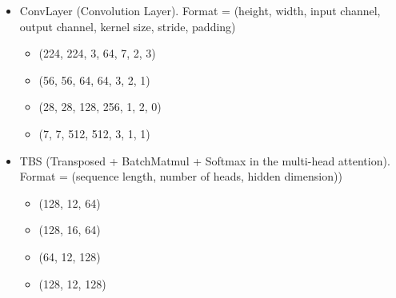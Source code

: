 \begin{itemize}
	\item ConvLayer (Convolution Layer). Format = (height, width, input channel, output channel, kernel size, stride, padding)
	\begin{itemize}[topsep=-0.1em, itemsep=-0.2em]
		\item (224, 224, 3, 64, 7, 2, 3)
		\item (56, 56, 64, 64, 3, 2, 1)
		\item  (28, 28, 128, 256, 1, 2, 0)
		\item (7, 7, 512, 512, 3, 1, 1)
	\end{itemize}
	
	\item TBS (Transposed + BatchMatmul + Softmax in the multi-head attention). Format = (sequence length, number of heads, hidden dimension))
	\begin{itemize}[topsep=-0.1em, itemsep=-0.2em]
		\item (128, 12, 64)
		\item (128, 16, 64)
		\item (64,  12, 128)
		\item (128, 12, 128)
	\end{itemize}
\end{itemize}

